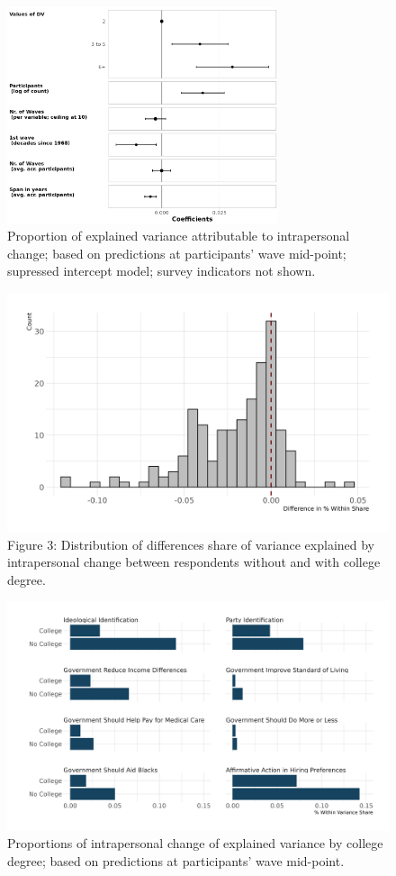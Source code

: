 \documentclass[
  11pt,
]{article}
\begin{document}
\newpage
\begin{figure}

{\centering \includegraphics[width=300px]{fig/meta_no_int} 

}

\caption{Proportion of explained variance attributable to intrapersonal change; based on predictions at participants' wave mid-point; supressed intercept model; survey indicators not shown.}\label{fig:fig2}
\end{figure}

\newpage
\begin{figure}

{\centering \includegraphics[width=450px]{fig/FIG_college1} 

}

\caption{Figure 3: Distribution of differences share of variance explained by intrapersonal change between respondents without and with college degree.}\label{fig:fig3}
\end{figure}

\newpage
\begin{figure}

{\centering \includegraphics[width=450px]{fig/FIG_college2} 

}

\caption{Proportions of intrapersonal change of explained variance by college degree; based on predictions at participants' wave mid-point.}\label{fig:fig4}
\end{figure}
\end{document}
